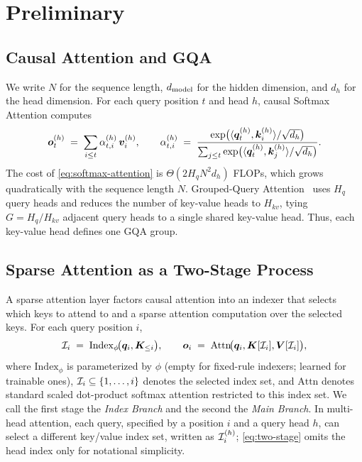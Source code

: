 \section{Preliminary}
\label{sec:preliminary}

\subsection{Causal Attention and GQA}
\label{sec:preliminary-attention-gqa}

We write $N$ for the sequence length, $d_{\rm model}$ for the hidden dimension, and $d_h$ for the head dimension. For each query position $t$ and head $h$, causal Softmax Attention computes
\begin{equation}
\label{eq:softmax-attention}
    {\bm{o}}_t^{(h)} \;=\; \sum_{i \le t} \alpha_{t,i}^{(h)} \, {\bm{v}}_i^{(h)},
    \qquad
    \alpha_{t,i}^{(h)} \;=\; \frac{\exp\!\big(\langle {\bm{q}}_t^{(h)}, {\bm{k}}_i^{(h)} \rangle / \sqrt{d_h}\big)}{\sum_{j \le t} \exp\!\big(\langle {\bm{q}}_t^{(h)}, {\bm{k}}_j^{(h)} \rangle / \sqrt{d_h}\big)}.
\end{equation}
The cost of \cref{eq:softmax-attention} is $\Theta(2H_q N^2 d_h)$ FLOPs, which grows quadratically with the sequence length $N$. Grouped-Query Attention~\citep{ainslie2023gqa} uses $H_q$ query heads and reduces the number of key-value heads to $H_{kv}$, tying $G=H_q/H_{kv}$ adjacent query heads to a single shared key-value head. Thus, each key-value head defines one GQA group. 


\subsection{Sparse Attention as a Two-Stage Process}
\label{sec:preliminary-sparse}

A sparse attention layer factors causal attention into an indexer that selects which keys to attend to and a sparse attention computation over the selected keys. For each query position $i$,
\begin{equation}
\label{eq:two-stage}
    {\mathcal{I}}_i \;=\; \mathrm{Index}_\phi\!\big({\bm{q}}_i, {\bm{K}}_{\le i}\big),
    \qquad
    {\bm{o}}_i \;=\; \mathrm{Attn}\!\big({\bm{q}}_i, {\bm{K}}[{\mathcal{I}}_i], {\bm{V}}[{\mathcal{I}}_i]\big),
\end{equation}
where $\mathrm{Index}_\phi$ is parameterized by $\phi$ (empty for fixed-rule indexers; learned for trainable ones), ${\mathcal{I}}_i \subseteq \{1, \dots, i\}$ denotes the selected index set, and $\mathrm{Attn}$ denotes standard scaled dot-product softmax attention restricted to this index set. We call the first stage the \emph{Index Branch} and the second the \emph{Main Branch}. In multi-head attention, each query, specified by a position $i$ and a query head $h$, can select a different key/value index set, written as ${\mathcal{I}}_i^{(h)}$; \cref{eq:two-stage} omits the head index only for notational simplicity.

